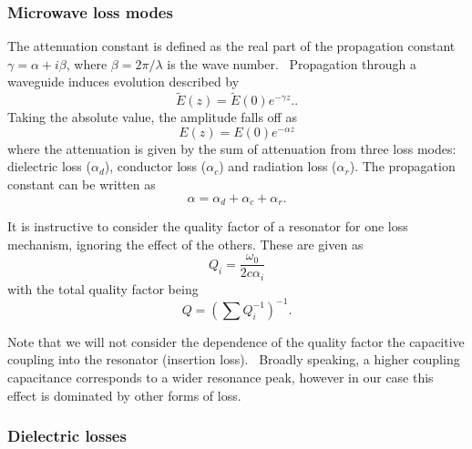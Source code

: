 \subsubsection{Microwave loss modes}

The attenuation constant is defined as the real part of the propagation
constant $\gamma = \alpha + i\beta$, where $\beta = 2\pi / \lambda$ is the wave
number.~\cite{Simons2004} Propagation through a waveguide induces evolution
described by
%
\begin{equation}
  \widetilde{E}(z) = \widetilde{E}(0)e^{-\gamma z}.
  \label{experiment:mw:eqn:Eloss}.
\end{equation}
%
Taking the absolute value, the amplitude falls off as
%
\begin{equation}
  E(z) = E(0)e^{-\alpha z}
\end{equation}
%
where the attenuation is given by the sum of attenuation from three loss modes:
dielectric loss ($\alpha_d$), conductor loss ($\alpha_c$) and radiation loss
($\alpha_r$). The propagation constant can be written as
%
\begin{equation}
  \alpha = \alpha_d + \alpha_c + \alpha_r.
\end{equation}

It is instructive to consider the quality factor of a resonator for one loss
mechanism, ignoring the effect of the others. These are given
as~\cite{Simons2004}
\begin{equation}
  Q_i = \frac{\omega_0}{2c\alpha_i}
\end{equation}
with the total quality factor being
\begin{equation}
  Q = \left(\sum Q_i^{-1} \right)^{-1}.
\end{equation}

Note that we will not consider the dependence of the quality factor the
capacitive coupling into the resonator (insertion loss).~\cite{Simons2004,
doi:10.1063/1.3010859} Broadly speaking, a higher coupling capacitance
corresponds to a wider resonance peak, however in our case this effect is
dominated by other forms of loss.

\subsubsection*{Dielectric losses}

